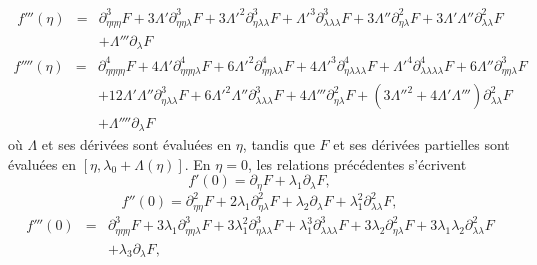 \documentclass{article}
\newcommand{\nocomma}{}
\newcommand{\nosymbol}{}
\begin{document}
\begin{eqnarray}
  \label{eq20211112173223} f''' (\eta) & = & \partial_{\eta \nocomma \eta
  \nocomma \eta}^3 F + 3 \Lambda' \partial_{\eta \nocomma \eta \nocomma
  \lambda}^3 {F + 3 \Lambda'}^2 \partial_{\eta \nocomma \lambda \nocomma
  \lambda}^3 {F + \Lambda'}^3 \partial_{\lambda \nocomma \lambda \nocomma
  \lambda}^3 F + 3 \Lambda'' \partial_{\eta \nocomma \lambda}^2 F + 3 \Lambda'
  \Lambda'' \partial_{\lambda \nocomma \lambda}^2 F \nonumber\\
  &  & \nosymbol + \Lambda''' \partial_{\lambda} F
\end{eqnarray}
\begin{eqnarray}
  f'''' (\eta) & = & \partial_{\eta \nocomma \eta \nocomma \eta \nocomma
  \eta}^4 F + 4 \Lambda' \partial_{\eta \nocomma \eta \nocomma \eta \nocomma
  \lambda}^4 {F + 6 \Lambda'}^2 \partial_{\eta \nocomma \eta \nocomma \lambda
  \nocomma \lambda}^4 {F + 4 \Lambda'}^3 \partial_{\eta \nocomma \lambda
  \nocomma \lambda \nocomma \lambda}^4 {F + \Lambda'}^4 \partial_{\lambda
  \nocomma \lambda \nocomma \lambda \nocomma \lambda}^4 F + 6 \Lambda''
  \partial_{\eta \nocomma \eta \nocomma \lambda}^3 F \nonumber\\
  &  & + 12 \Lambda' \Lambda'' \partial_{\eta \nocomma \lambda \nocomma
  \lambda}^3 {F + 6 \Lambda'}^2 \Lambda'' \partial_{\lambda \nocomma \lambda
  \nocomma \lambda}^3 F + 4 \Lambda''' \partial_{\eta \nocomma \lambda}^2 F +
  \left( {3 \Lambda''}^2 + 4 \Lambda' \Lambda''' \right) \partial_{\lambda
  \nocomma \lambda}^2 F \\
  &  & + \Lambda'''' \partial_{\lambda} F
\end{eqnarray}
où $\Lambda$ et ses dérivées sont évaluées en $\eta$,
tandis que $F$ et ses dérivées partielles sont évaluées en
$[\eta, \lambda_0 + \Lambda (\eta)]$. En $\eta = 0$, les relations
précédentes s'écrivent
\begin{equation}
  \label{eq20220107060454} f' (0) = \partial_{\eta} F + \lambda_1
  \partial_{\lambda} F,
\end{equation}
\begin{equation}
  \label{eq20220107124311} f'' (0) = \partial_{\eta \nocomma \eta}^2 F + 2
  \lambda_1 \partial_{\eta \nocomma \lambda}^2 F + \lambda_2
  \partial_{\lambda} F + \lambda_1^2 \partial_{\lambda \nocomma \lambda}^2 F,
\end{equation}
\begin{eqnarray}
  f''' (0) & = & \partial_{\eta \nocomma \eta \nocomma \eta}^3 F + 3 \lambda_1
  \partial_{\eta \nocomma \eta \nocomma \lambda}^3 F + 3 \lambda_1^2
  \partial_{\eta \nocomma \lambda \nocomma \lambda}^3 F + \lambda_1^3
  \partial_{\lambda \nocomma \lambda \nocomma \lambda}^3 F + 3 \lambda_2
  \partial_{\eta \nocomma \lambda}^2 F + 3 \lambda_1 \lambda_2
  \partial_{\lambda \nocomma \lambda}^2 F \nonumber\\
  &  & \nosymbol + \lambda_3 \partial_{\lambda} F,  \label{eq20220107060500}
\end{eqnarray}
\end{document}
